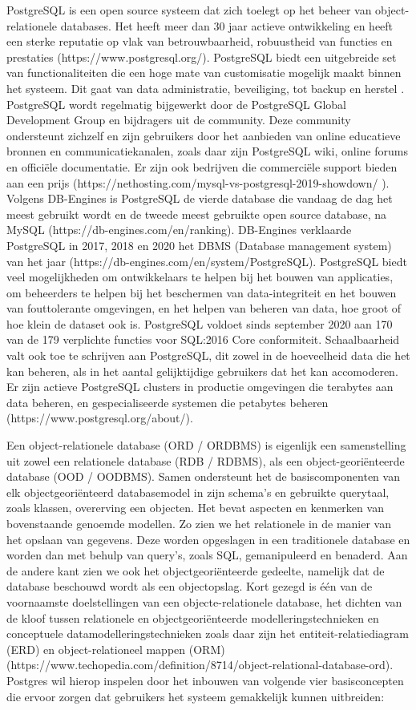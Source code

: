 PostgreSQL is een open source systeem dat zich toelegt op het beheer van object-relationele databases. Het heeft meer dan 30 jaar actieve ontwikkeling en heeft een sterke reputatie op vlak van betrouwbaarheid, robuustheid van functies en prestaties (https://www.postgresql.org/). PostgreSQL biedt een uitgebreide set van functionaliteiten die een hoge mate van customisatie mogelijk maakt binnen het systeem. Dit gaat van data administratie, beveiliging, tot backup en herstel . PostgreSQL wordt regelmatig bijgewerkt door de PostgreSQL Global Development Group en bijdragers uit de community. Deze community ondersteunt zichzelf en zijn gebruikers door het aanbieden van online educatieve bronnen en communicatiekanalen, zoals daar zijn PostgreSQL wiki, online forums en officiële documentatie. Er zijn ook bedrijven die commerciële support bieden aan een prijs (https://nethosting.com/mysql-vs-postgresql-2019-showdown/ ). Volgens DB-Engines is PostgreSQL de vierde database die vandaag de dag het meest gebruikt wordt en de tweede meest gebruikte open source database, na MySQL (https://db-engines.com/en/ranking). DB-Engines verklaarde PostgreSQL in 2017, 2018 en 2020 het DBMS (Database management system) van het jaar (https://db-engines.com/en/system/PostgreSQL). PostgreSQL biedt veel mogelijkheden om ontwikkelaars te helpen bij het bouwen van applicaties, om beheerders te helpen bij het beschermen van data-integriteit en het bouwen van fouttolerante omgevingen, en het helpen van beheren van data, hoe groot of hoe klein de dataset ook is. PostgreSQL voldoet sinds september 2020 aan 170 van de 179 verplichte functies voor SQL:2016 Core conformiteit. Schaalbaarheid valt ook toe te schrijven aan PostgreSQL, dit zowel in de hoeveelheid data die het kan beheren, als in het aantal gelijktijdige gebruikers dat het kan accomoderen. Er zijn actieve PostgreSQL clusters in productie omgevingen die terabytes aan data beheren, en gespecialiseerde systemen die petabytes beheren (https://www.postgresql.org/about/).


Een object-relationele database (ORD / ORDBMS) is eigenlijk een samenstelling uit zowel een relationele database (RDB / RDBMS), als een object-georiënteerde database (OOD / OODBMS). Samen ondersteunt het de basiscomponenten van elk objectgeoriënteerd databasemodel in zijn schema's en gebruikte querytaal, zoals klassen, overerving een objecten. Het bevat aspecten en kenmerken van bovenstaande genoemde modellen. Zo zien we het relationele in de manier van het opslaan van gegevens. Deze worden opgeslagen in een traditionele database en worden dan met behulp van query's, zoals SQL, gemanipuleerd en benaderd. Aan de andere kant zien we ook het objectgeoriënteerde gedeelte, namelijk dat de database beschouwd wordt als een objectopslag. Kort gezegd is één van de voornaamste doelstellingen van een objecte-relationele database, het dichten van de kloof tussen relationele en objectgeoriënteerde modelleringstechnieken en conceptuele datamodelleringstechnieken zoals daar zijn het entiteit-relatiediagram (ERD) en object-relationeel mappen (ORM) (https://www.techopedia.com/definition/8714/object-relational-database-ord).
Postgres wil hierop inspelen door het inbouwen van volgende vier basisconcepten die ervoor zorgen dat gebruikers het systeem gemakkelijk kunnen uitbreiden:

